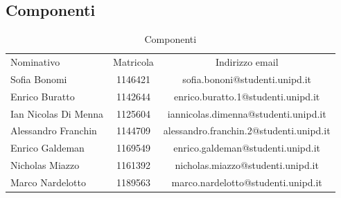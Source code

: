 \documentclass[../piano-di-progetto.tex]{subfiles}
\begin{document}
  \subsection{Componenti}
  \begin{table}[H]
    \centering
    \begin{tabular}{lcc}
      Nominativo & Matricola & Indirizzo email \\
      Sofia Bonomi & 1146421 & sofia.bononi@studenti.unipd.it              \\
      Enrico Buratto & 1142644 & enrico.buratto.1@studenti.unipd.it               \\
      Ian Nicolas Di Menna & 1125604 & iannicolas.dimenna@studenti.unipd.it             \\
      Alessandro Franchin & 1144709 & alessandro.franchin.2@studenti.unipd.it               \\
      Enrico Galdeman & 1169549 & enrico.galdeman@studenti.unipd.it               \\
      Nicholas Miazzo & 1161392 & nicholas.miazzo@studenti.unipd.it               \\
      Marco Nardelotto & 1189563 & marco.nardelotto@studenti.unipd.it
    \end{tabular}
    \caption{Componenti}
  \end{table}
\end{document}
